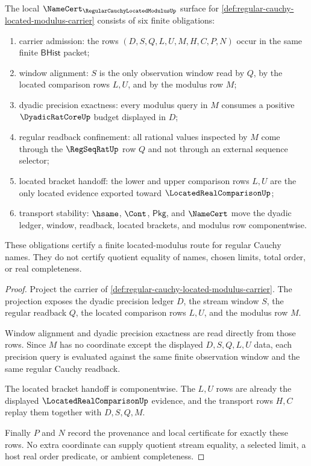 \begin{theorem}
\label{thm:regular-cauchy-located-modulus-namecert-obligations}
The local $\NameCert_{\RegularCauchyLocatedModulusUp}$ surface for
\autoref{def:regular-cauchy-located-modulus-carrier} consists of six finite
obligations:
\begin{enumerate}
\item carrier admission: the rows $(D,S,Q,L,U,M,H,C,P,N)$ occur in the same
finite $\mathsf{BHist}$ packet;
\item window alignment: $S$ is the only observation window read by $Q$, by the
located comparison rows $L,U$, and by the modulus row $M$;
\item dyadic precision exactness: every modulus query in $M$ consumes a
positive $\DyadicRatCoreUp$ budget displayed in $D$;
\item regular readback confinement: all rational values inspected by $M$ come
through the $\RegSeqRatUp$ row $Q$ and not through an external sequence
selector;
\item located bracket handoff: the lower and upper comparison rows $L,U$ are
the only located evidence exported toward $\LocatedRealComparisonUp$;
\item transport stability: $\hsame$, $\Cont$, $\mathsf{Pkg}$, and $\NameCert$
move the dyadic ledger, window, readback, located brackets, and modulus row
componentwise.
\end{enumerate}
These obligations certify a finite located-modulus route for regular Cauchy
names. They do not certify quotient equality of names, chosen limits, total
order, or real completeness.
\end{theorem}
\begin{proof}
Project the carrier of
\autoref{def:regular-cauchy-located-modulus-carrier}. The projection exposes
the dyadic precision ledger $D$, the stream window $S$, the regular readback
$Q$, the located comparison rows $L,U$, and the modulus row $M$.

Window alignment and dyadic precision exactness are read directly from those
rows. Since $M$ has no coordinate except the displayed $D,S,Q,L,U$ data, each
precision query is evaluated against the same finite observation window and the
same regular Cauchy readback.

The located bracket handoff is componentwise. The $L,U$ rows are already the
displayed $\LocatedRealComparisonUp$ evidence, and the transport rows $H,C$
replay them together with $D,S,Q,M$.

Finally $P$ and $N$ record the provenance and local certificate for exactly
these rows. No extra coordinate can supply quotient stream equality, a selected
limit, a host real order predicate, or ambient completeness.
\end{proof}


